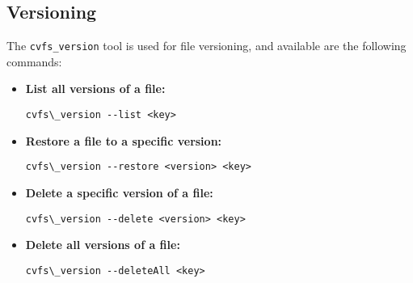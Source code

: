 \subsection*{Versioning}

The \texttt{cvfs\_version} tool is used for file versioning, and available are the following commands:

\begin{itemize}
    \setlength\itemsep{-0.1em}
    \item \textbf{List all versions of a file:} \\
    \begin{BVerbatim}[baseline=t,boxwidth=10cm]
  cvfs\_version --list <key>
    \end{BVerbatim}

    \item \textbf{Restore a file to a specific version:} \\
    \begin{BVerbatim}[baseline=t,boxwidth=10cm]
  cvfs\_version --restore <version> <key>
    \end{BVerbatim}

    \item \textbf{Delete a specific version of a file:} \\
    \begin{BVerbatim}[baseline=t,boxwidth=10cm]
  cvfs\_version --delete <version> <key>
    \end{BVerbatim}

    \item \textbf{Delete all versions of a file:} \\
    \begin{BVerbatim}[baseline=t,boxwidth=10cm]
  cvfs\_version --deleteAll <key>
    \end{BVerbatim}
\end{itemize}